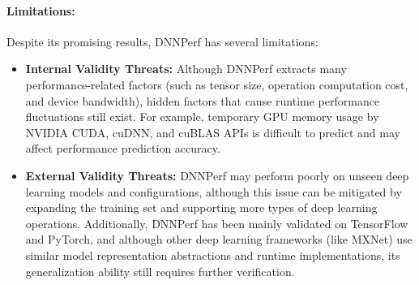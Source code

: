 \documentclass[10pt,journal,compsoc]{IEEEtran}
\begin{document}
\paragraph{Limitations:} Despite its promising results, DNNPerf has several limitations:
\begin{itemize}
    \item \textbf{Internal Validity Threats:} Although DNNPerf extracts many performance-related factors (such as tensor size, operation computation cost, and device bandwidth), hidden factors that cause runtime performance fluctuations still exist. For example, temporary GPU memory usage by NVIDIA CUDA, cuDNN, and cuBLAS APIs is difficult to predict and may affect performance prediction accuracy.
    \item \textbf{External Validity Threats:} DNNPerf may perform poorly on unseen deep learning models and configurations, although this issue can be mitigated by expanding the training set and supporting more types of deep learning operations. Additionally, DNNPerf has been mainly validated on TensorFlow and PyTorch, and although other deep learning frameworks (like MXNet) use similar model representation abstractions and runtime implementations, its generalization ability still requires further verification.
\end{itemize}


\end{document}
